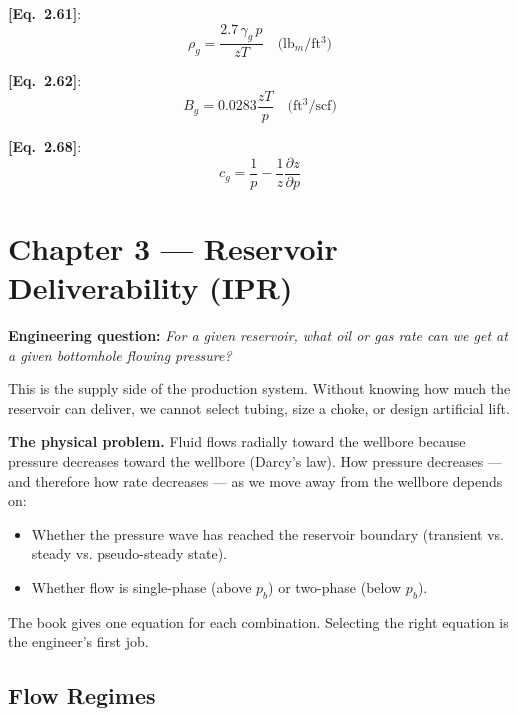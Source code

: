 \documentclass[11pt,a4paper,openany]{book}
\newcommand{\eqrefbook}[1]{\textcolor{blue!60!black}{\textbf{[Eq.~#1]}}}
\begin{document}
\eqrefbook{2.61}:
\begin{equation}
  \rho_g = \frac{2.7\,\gamma_g\,p}{zT}\quad\text{(lb$_m$/ft$^3$)}
\end{equation}

\eqrefbook{2.62}:
\begin{equation}
  B_g = 0.0283\frac{zT}{p}\quad\text{(ft$^3$/scf)}
\end{equation}

\eqrefbook{2.68}:
\begin{equation}
  c_g = \frac{1}{p} - \frac{1}{z}\frac{\partial z}{\partial p}
\end{equation}

\chapter{Chapter 3 — Reservoir Deliverability (IPR)}

\begin{purpose}
\textbf{Engineering question:} \emph{For a given reservoir, what oil
or gas rate can we get at a given bottomhole flowing pressure?}

This is the supply side of the production system. Without knowing how
much the reservoir can deliver, we cannot select tubing, size a choke,
or design artificial lift.
\end{purpose}

\begin{theory}
\textbf{The physical problem.} Fluid flows radially toward the
wellbore because pressure decreases toward the wellbore (Darcy's
law). How pressure decreases — and therefore how rate decreases — as
we move away from the wellbore depends on:
\begin{itemize}
  \item Whether the pressure wave has reached the reservoir boundary
        (transient vs. steady vs. pseudo-steady state).
  \item Whether flow is single-phase (above $p_b$) or two-phase
        (below $p_b$).
\end{itemize}

The book gives one equation for each combination. Selecting the right
equation is the engineer's first job.
\end{theory}

\section{Flow Regimes}
\end{document}
